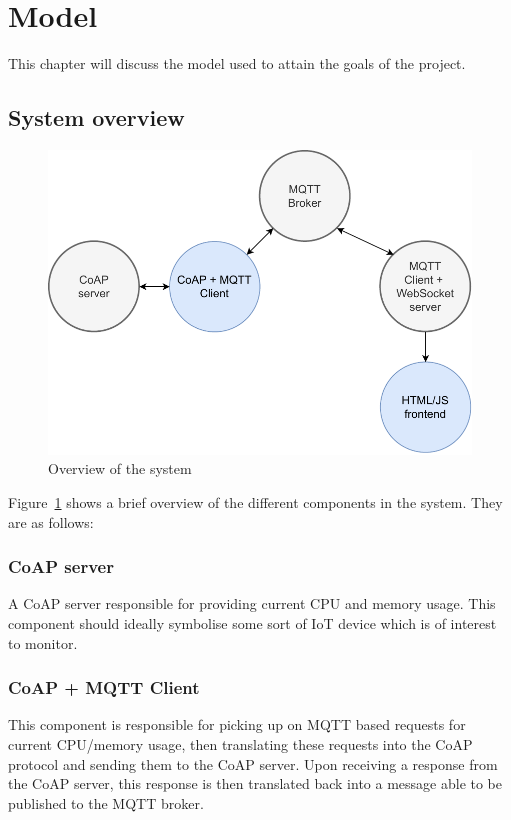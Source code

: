 \section{Model}
\label{ch:method}
\noindent	

This chapter will discuss the model used to attain the goals of the project.

\subsection{System overview}

\begin{figure}[H]
	\begin{center}
		\includegraphics[width=\textwidth]{./doc/system}
		\caption{Overview of the system}
		\label{system-overview}
	\end{center}
\end{figure}

Figure~\ref{system-overview} shows a brief overview of the different components in the system. They are as follows:

\subsubsection{CoAP server} A CoAP server responsible for providing current CPU and memory usage. This component should ideally symbolise some sort of IoT device which is of interest to monitor.

\subsubsection{CoAP + MQTT Client} This component is responsible for picking up on MQTT based requests for current CPU/memory usage, then translating these requests into the CoAP protocol and sending them to the CoAP server. Upon receiving a response from the CoAP server, this response is then translated back into a message able to be published to the MQTT broker.

